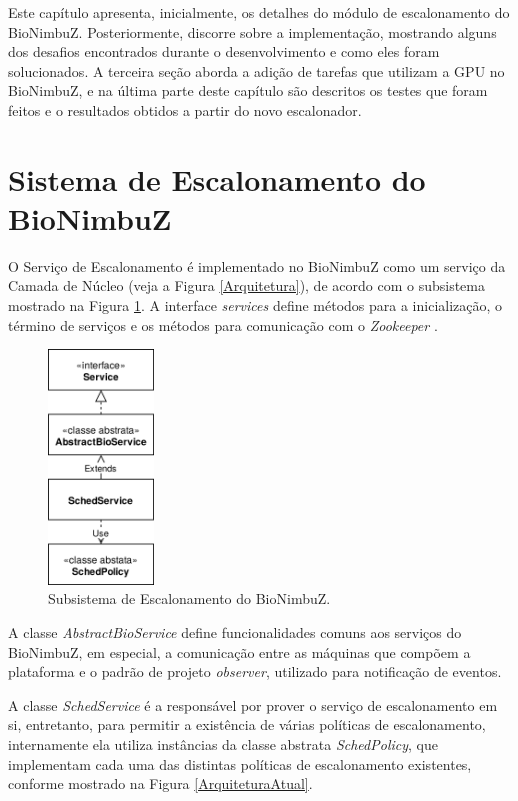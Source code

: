 
Este capítulo apresenta, inicialmente, os detalhes do módulo de escalonamento do BioNimbuZ. Posteriormente, discorre sobre a implementação, mostrando alguns dos desafios encontrados durante o desenvolvimento e como eles foram solucionados. A terceira seção aborda a adição de tarefas que utilizam a \acrshort{GPU} no BioNimbuZ, e na última parte deste capítulo são descritos os testes que foram feitos e o resultados obtidos a partir do novo escalonador.

\section{Sistema de Escalonamento do BioNimbuZ}

O Serviço de Escalonamento é implementado no BioNimbuZ como um serviço da Camada de Núcleo (veja a Figura \ref{Arquitetura}), de acordo com o subsistema mostrado na Figura \ref{SubsistemaDeEscalonamento}. A interface \textit{services} define métodos para a inicialização, o término de serviços e os métodos para comunicação com o \textit{Zookeeper} \cite{Zookeeper}. 
\begin{figure}[htbp]
	\centerline{\includegraphics[width=2.8cm]{img/SubsistemaDeEscalonamento.png}}
	\caption{Subsistema de Escalonamento do BioNimbuZ.}
	\label{SubsistemaDeEscalonamento}
\end{figure}
A classe \textit{AbstractBioService} define funcionalidades comuns aos serviços do BioNimbuZ, em especial, a comunicação entre as máquinas que compõem a plataforma e o padrão de projeto \textit{observer}, utilizado para notificação de eventos.

A classe \textit{SchedService} é a responsável por prover o serviço de escalonamento em si, entretanto, para permitir a existência de várias políticas de escalonamento, internamente ela utiliza instâncias da classe abstrata \textit{SchedPolicy}, que implementam cada uma das distintas políticas de escalonamento existentes, conforme mostrado na Figura \ref{ArquiteturaAtual}.


